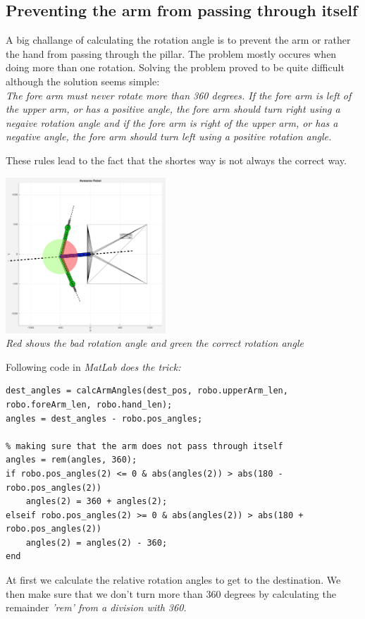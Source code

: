 \subsection{Preventing the arm from passing through itself}
A big challange of calculating the rotation angle is to prevent the arm or rather the hand from passing through the pillar. The problem mostly occures when doing more than one rotation. Solving the problem proved to be quite difficult although the solution seems simple:\\

{\em The fore arm must never rotate more than 360 degrees. If the fore arm is left of the upper arm, or has a positive angle, the fore arm should turn right using a negaive rotation angle and if the fore arm is right of the upper arm, or has a negative angle, the fore arm should turn left using a positive rotation angle.}

These rules lead to the fact that the shortes way is not always the correct way.

\begin{center}
\includegraphics[width=0.45\textwidth]{imgs/AngleCalc/robot_passThroughProblem.jpg}\\
\textit{Red shows the bad rotation angle and green the correct rotation angle}
\end{center}

Following code in \em{MatLab} does the trick:

\begin{verbatim}
dest_angles = calcArmAngles(dest_pos, robo.upperArm_len, robo.foreArm_len, robo.hand_len);
angles = dest_angles - robo.pos_angles;
    
% making sure that the arm does not pass through itself
angles = rem(angles, 360);
if robo.pos_angles(2) <= 0 & abs(angles(2)) > abs(180 - robo.pos_angles(2))
	angles(2) = 360 + angles(2);
elseif robo.pos_angles(2) >= 0 & abs(angles(2)) > abs(180 + robo.pos_angles(2))
	angles(2) = angles(2) - 360;
end
\end{verbatim}

At first we calculate the relative rotation angles to get to the destination. We then make sure that we don't turn more than 360 degrees by calculating the remainder \em{'rem'} from a division with 360.

